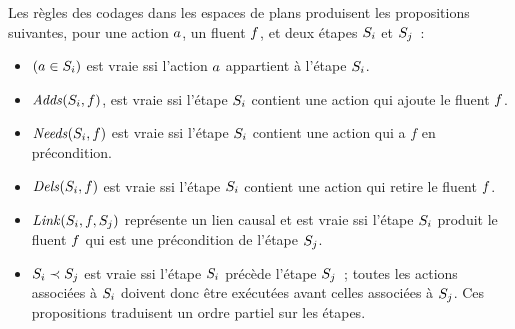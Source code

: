 
Les règles des codages dans les espaces de plans produisent les propositions suivantes, pour une action $a$, un fluent $f$, et deux étapes $S_{i}$ et $S_{j}$~:

\begin{itemize}
\item $(a \in S_{i})$ est vraie ssi l'action $a$ appartient à l'étape $S_{i}$.
\item $\mathit{Adds}(S_{i},f)$, est vraie ssi l'étape $S_{i}$ contient une action qui ajoute le
  fluent $f$.
\item $\mathit{Needs}(S_{i},f)$ est vraie ssi l'étape $S_{i}$ contient une action qui a $f$ en
  précondition.
\item $\mathit{Dels}(S_{i},f)$ est vraie ssi l'étape $S_{i}$ contient une action qui retire le
  fluent $f$.
\item $\mathit{Link}(S_{i},f,S_{j})$ représente un lien causal et est vraie ssi l'étape
  $S_{i}$ produit le fluent $f$ qui est une précondition de l'étape $S_{j}$.
\item $S_{i} \prec S_{j}$ est vraie ssi l'étape $S_{i}$ précède l'étape $S_{j}$~; toutes les actions
  associées à $S_{i}$ doivent donc être exécutées avant celles associées à $S_{j}$.
  Ces propositions traduisent un ordre partiel sur les étapes.
\end{itemize}


